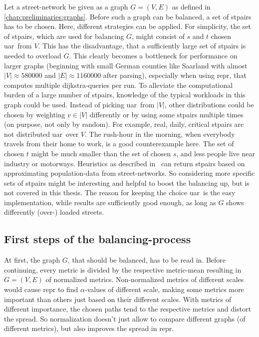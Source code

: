         Let a street-network be given as a graph $G = (V, E)$ as defined in \cref{chap:preliminaries:graphs}.
        Before such a graph can be balanced, a set of \glspl{stpair} has to be chosen.
        Here, different strategies can be applied.
        For simplicity, the set of \glspl{stpair}, which are used for balancing $G$, might consist of $s$ and $t$ chosen \gls{uar}\ from $V$.
        This has the disadvantage, that a sufficiently large set of \glspl{stpair} is needed to overload $G$.
        This clearly becomes a bottleneck for performance on larger graphs (beginning with small German counties like Saarland with almost $|V| \approx \num{580000}$ and $|E| \approx \num{1160000}$ after parsing), especially when using \gls{repr}, that computes multiple \gls{dijkstra}-queries per run.
        To alleviate the computational burden of a large number of \glspl{stpair}, knowledge of the typical workloads in this graph could be used.
        Instead of picking \gls{uar}\ from $|V|$, other distributions could be chosen by weighting $v \in |V|$ differently or by using some \glspl{stpair} multiple times (on purpose, not only by random).
        For example, real, daily, critical \glspl{stpair} are not distributed \gls{uar}\ over $V$.
        The rush-hour in the morning, when everybody travels from their home to work, is a good counterexample here.
        The set of chosen $t$ might be much smaller than the set of chosen $s$, and less people live near industry or motorways.
        Heuristics as described in~\cite{bakillah:population_from_osm} can return \glspl{stpair} based on approximating population-data from street-networks.
        So considering more specific sets of \glspl{stpair} might be interesting and helpful to boost the \gls{balancing} up, but is not covered in this thesis.
        The reason for keeping the choice \gls{uar}\ is the easy implementation, while results are sufficiently good enough, as long as $G$ shows differently (over-) loaded streets.

    \subsection{First steps of the balancing-process}
    \label{chap:balancing:balancing}

        At first, the graph $G$, that should be balanced, has to be read in.
        Before continuing, every \gls{metric} is divided by the respective \gls{metric}-mean resulting in $G = (V, E)$ of normalized \glspl{metric}.
        Non-normalized \glspl{metric} of different scales would cause \gls{repr} to find $\alpha$-values of different scale, making some \glspl{metric} more important than others just based on their different scales.
        With \glspl{metric} of different importance, the chosen paths tend to the respective \glspl{metric} and distort the spread.
        So normalization doesn't just allow to compare different graphs (of different \glspl{metric}), but also improves the spread in \gls{repr}.

